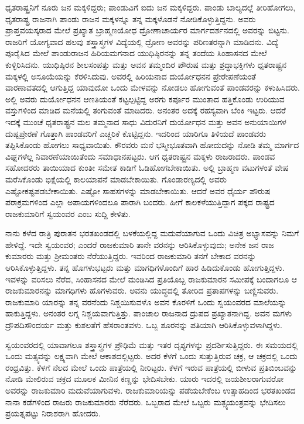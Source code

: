 ಧೃತರಾಷ್ಟ್ರನಿಗೆ ನೂರು ಜನ ಮಕ್ಕಳಿದ್ದರು; ಪಾಂಡುವಿಗೆ ಐದು ಜನ ಮಕ್ಕಳಿದ್ದರು. ಪಾಂಡು ಬಾಲ್ಯದಲ್ಲೆ ತೀರಿಹೋಗಲು, ಧೃತರಾಷ್ಟ್ರ ರಾಜನಾಗಿ ಪಾಂಡು ರಾಜನ ಮಕ್ಕಳನ್ನೂ ತನ್ನ ಮಕ್ಕಳೊಡನೆ ನೋಡಿಕೊಳ್ಳುತ್ತಿದ್ದನು. ಅವರು ಪ್ರಾಪ್ತವಯಸ್ಕರಾದ ಮೇಲೆ ಪ್ರಖ್ಯಾತ ಬ್ರಾಹ್ಮಣಯೋಧ ದ್ರೋಣಾಚಾರ್ಯರ ಮಾರ್ಗದರ್ಶನದಲ್ಲಿ ಅವರನ್ನು ಬಿಟ್ಟನು. ರಾಜರಿಗೆ ಯೋಗ್ಯವಾದ ಹಲವು ಶಸ್ತ್ರಾಸ್ತ್ರಗಳ ವಿದ್ಯೆಯಲ್ಲಿ ದ್ರೋಣ ಅವರನ್ನು ಪರಿಣತರನ್ನಾಗಿ ಮಾಡಿದನು. ವಿದ್ಯೆ ಪೂರೈಸಿದ ಮೇಲೆ ಪಾಂಡುರಾಜನ ಹಿರಿಯಮಗನಾದ ಯುಧಿಷ್ಠಿರನನ್ನು ತನ್ನ ತಂದೆಯ ಸಿಂಹಾಸನದ ಮೇಲೆ ಕುಳ್ಳಿರಿಸಿದನು. ಯುಧಿಷ್ಠಿರನ ಶೀಲಸಂಪತ್ತು ಮತ್ತು ಅವನ ತಮ್ಮಂದಿರ ಪೌರುಷ ಮತ್ತು ಶ್ರದ್ಧಾಭಕ್ತಿಗಳು ಧೃತರಾಷ್ಟ್ರನ ಮಕ್ಕಳಲ್ಲಿ ಅಸೂಯೆಯನ್ನು ಕೆರಳಿಸಿದುವು. ಅವರಲ್ಲಿ ಹಿರಿಯನಾದ ದುರ್ಯೋಧನನ ಪ್ರೇರೇಪಣೆಯಂತೆ ವಾರಣಾವತದಲ್ಲಿ ಆಗುತ್ತಿದ್ದ ಯಾವುದೋ ಒಂದು ಮೇಳವನ್ನು ನೋಡಲು ಹೋಗುವಂತೆ ಪಾಂಡವರನ್ನು ಕಳುಹಿಸಿದರು. ಅಲ್ಲಿ ಅವರು ದುರ್ಯೋಧನನ ಆಣತಿಯಂತೆ ಕಟ್ಟಲ್ಪಟ್ಟಿದ್ದ ಅರಗು ಕರ್ಪೂರ ಮುಂತಾದ ಹತ್ತಿಕೊಂಡು ಉರಿಯುವ ವಸ್ತುಗಳಿಂದ ಮಾಡಿದ ಮನೆಯಲ್ಲಿ ತಂಗುವಂತೆ ಮಾಡಿದರು. ಅನಂತರ ಅದಕ್ಕೆ ರಹಸ್ಯವಾಗಿ ಬೆಂಕಿ ಇಟ್ಟರು. ಆದರೆ ಇದಕ್ಕೆ ಮುಂಚೆ ಧೃತರಾಷ್ಟ್ರನ ಮಲ ತಮ್ಮನಾದ ಸಾಧು ವಿದುರನಿಗೆ ದುರ್ಯೋಧನ ಮತ್ತು ಅವನ ಅನುಯಾಯಿಗಳ ದುಷ್ಟಪ್ರೇರಣೆ ಗೊತ್ತಾಗಿ ಪಾಂಡವರಿಗೆ ಎಚ್ಚರಿಕೆ ಕೊಟ್ಟಿದ್ದನು. ಇದರಿಂದ ಯಾರಿಗೂ ತಿಳಿಯದೆ ಪಾಂಡವರು ತಪ್ಪಿಸಿಕೊಂಡು ಹೋಗಲು ಸಾಧ್ಯವಾಯಿತು. ಕೌರವರು ಮನೆ ಭಸ್ಮೀಭೂತವಾಗಿ ಹೋದುದನ್ನು ನೋಡಿ ತಮ್ಮ ಮಾರ್ಗದ ವಿಘ್ನಗಳೆಲ್ಲ ನಿವಾರಣೆಯಾಯಿತೆಂದು ಸಮಾಧಾನಪಟ್ಟರು. ಆಗ ಧೃತರಾಷ್ಟ್ರನ ಮಕ್ಕಳು ರಾಜರಾದರು. ಪಾಂಡವ ಸಹೋದರರು ತಾಯಿಯಾದ ಕುಂತೀ ಸಮೇತ ಕಾಡಿಗೆ ಓಡಿಹೋಗಬೇಕಾಯಿತು. ಅಲ್ಲಿ ಬ್ರಾಹ್ಮಣ ವಟುಗಳಂತೆ ವೇಷ ಮರೆಸಿಕೊಂಡು ಭಿಕ್ಷೆಯಲ್ಲಿ ಕಾಲಯಾಪನೆ ಮಾಡಬೇಕಾಯಿತು. ಗೊಂಡಾರಣ್ಯದಲ್ಲಿ ಅವರು ಎಷ್ಟೋ\break ಕಷ್ಟಪಡಬೇಕಾಯಿತು. ಎಷ್ಟೋ ಸಾಹಸಗಳನ್ನು ಮಾಡಬೇಕಾಯಿತು. ಆದರೆ ಅವರ ಧೈರ್ಯ ಪೌರುಷ ಪರಾಕ್ರಮಗಳಿಂದ ಎಲ್ಲಾ ಅಪಾಯಗಳಿಂದಲೂ ಪಾರಾಗಿ ಬಂದರು. ಹೀಗೆ ಕಾಲಕಳೆಯುತ್ತಿದ್ದಾಗ ಪಕ್ಕದ ರಾಷ್ಟ್ರದ ರಾಜಕುಮಾರಿಗೆ ಸ್ವಯಂವರ ಎಂಬ ಸುದ್ದಿ ಕೇಳಿತು.

\vskip 0.1cm

ನಾನು ಕಳೆದ ರಾತ್ರಿ ಪುರಾತನ ಭರತಖಂಡದಲ್ಲಿ ಬಳಕೆಯಲ್ಲಿದ್ದ ಮದುವೆಯಾಗುವ ಒಂದು ವಿಚಿತ್ರ ಅಭ್ಯಾಸವನ್ನು ನಿಮಗೆ ಹೇಳಿದ್ದೆ. ಇದೇ ಸ್ವಯಂವರ; ಎಂದರೆ ರಾಜಕುಮಾರಿ ತಾನೇ ವರನನ್ನು ಆರಿಸಿಕೊಳ್ಳುವುದು; ಅನೇಕ ಜನ ರಾಜ ಕುಮಾರರು ಮತ್ತು ಶ‍್ರೀಮಂತರು ನೆರೆಯುತ್ತಿದ್ದರು. ಇವರಿಂದ ರಾಜಕುಮಾರಿ ತನಗೆ ಬೇಕಾದ ವರನನ್ನು ಆರಿಸಿಕೊಳ್ಳುತ್ತಿದ್ದಳು. ತನ್ನ ಹೊಗಳುಭಟ್ಟರು ಮತ್ತು ಮಾಗಧಿಗಳೊಂದಿಗೆ ಹಾರ ಹಿಡಿದುಕೊಂಡು ಹೋಗುತ್ತಿದ್ದಳು. ಇವಳನ್ನು ವರಿಸಲು ನೆರೆದ, ಸಿಂಹಾಸನದ ಮೇಲೆ ಮಂಡಿಸಿದ ಪ್ರತಿಯೊಬ್ಬ ರಾಜಕುಮಾರನ ಸಮೀಪಕ್ಕೆ ಬಂದಾಗಲೂ ಆ ರಾಜಕುಮಾರನನ್ನು ಮಾಗಧಿಗಳು ಹೊಗಳುವರು. ಅವನು ಯುದ್ಧದಲ್ಲಿ ತೋರಿದ ಪ್ರತಾಪಗಳನ್ನು ಬಣ್ಣಿಸುವರು. ರಾಜಕುಮಾರಿ ಯಾರನ್ನು ತನ್ನ ವರನೆಂದು ನಿಶ್ಚಯಿಸುವಳೊ ಅವನ ಕೊರಳಿಗೆ ಒಂದು ಸ್ವಯಂವರದ ಮಾಲೆಯನ್ನು ಹಾಕುತ್ತಿದ್ದಳು. ಅನಂತರ ಲಗ್ನ ನಿಶ್ಚಯವಾಗುತ್ತಿತ್ತು. ಪಾಂಚಾಲ ರಾಜನಾದ ದ್ರುಪದ ಪ್ರಖ್ಯಾತನಾಗಿದ್ದ. ಅವನ ಮಗಳು ದ್ರೌಪದಿ\break ಸೌಂದರ್ಯ ಮತ್ತು ಕುಶಲತೆಗೆ ಹೆಸರಾಂತವಳು. ಒಬ್ಬ ಶೂರನನ್ನು ಪತಿಯಾಗಿ ಆರಿಸಿಕೊಳ್ಳುವಳಾಗಿದ್ದಳು.

\vskip 0.1cm

ಸ್ವಯಂವರದಲ್ಲಿ ಯಾವಾಗಲೂ ಶಸ್ತ್ರಾಸ್ತ್ರಗಳ ಪ್ರೌಢಿಮೆ ಮತ್ತು ಇತರ ದೃಶ್ಯಗಳನ್ನು ಪ್ರದರ್ಶಿಸುತ್ತಿದ್ದರು. ಈ ಸಮಯದಲ್ಲಿ ಒಂದು ಮತ್ಸ್ಯವನ್ನು ಲಕ್ಷ್ಯವಾಗಿ ಮೇಲೆ ಆಕಾಶದಲ್ಲಿಟ್ಟರು. ಅದರ ಕೆಳಗೆ ಒಂದು ಸುತ್ತುತ್ತಿರುವ ಚಕ್ರ, ಆ ಚಕ್ರದಲ್ಲಿ ಒಂದು ರಂಧ್ರವಿತ್ತು. ಕೆಳಗೆ ನೆಲದ ಮೇಲೆ ಒಂದು ಪಾತ್ರೆಯಲ್ಲಿ ನೀರಿಟ್ಟರು. ಕೆಳಗೆ ಇರುವ ಪಾತ್ರೆಯಲ್ಲಿ ಬೀಳುವ ಪ್ರತಿಬಿಂಬವನ್ನು ನೋಡಿ ಮೇಲಿರುವ ಚಕ್ರದ ಮೂಲಕ ಮೀನಿನ ಕಣ್ಣನ್ನು ಭೇದಿಸಬೇಕು. ಯಾರು ಇದರಲ್ಲಿ ಜಯಶೀಲರಾಗುವರೋ ಅವರನ್ನು ರಾಜಕುಮಾರಿ ಮದುವೆಯಾಗುವಳು. ರಾಜಕುಮಾರಿಯನ್ನು ಪಡೆಯಬೇಕೆಂಬ ಉತ್ಸಾಹದಿಂದ ಭರತಖಂಡದ ನಾನಾ ಕಡೆಗಳಿಂದ ರಾಜರು ರಾಜಕುಮಾರರು ನೆರೆದರು. ಒಬ್ಬರಾದ ಮೇಲೆ ಒಬ್ಬರು ಮತ್ಸ್ಯಯಂತ್ರವನ್ನು ಭೇದಿಸಲು ಪ್ರಯತ್ನಪಟ್ಟು ನಿರಾಶರಾಗಿ ಹೋದರು.

